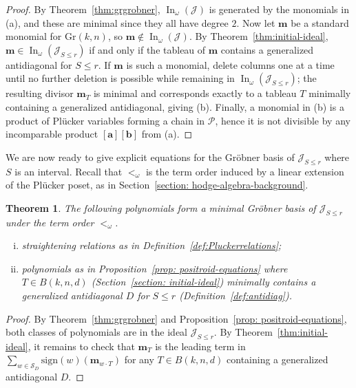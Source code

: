 \documentclass[12pt,reqno]{amsart}
\newtheorem{theorem}[lemma]{Theorem}
\theoremstyle{definition}
\newcommand{\inn}{\operatorname{In}}
\newcommand{\sgn}{\text{sign}}
\renewcommand{\aa}{\mathbf a}
\newcommand{\bb}{\mathbf b}
\newcommand{\mm}{\mathbf m}
\newcommand{\cJ}{\mathcal{J}}
\newcommand{\symm}{\mathcal{S}}
\newcommand{\gr}{\mathrm{Gr}}
\begin{document}
{\begin{proof}
By Theorem~\ref{thm:grgrobner}, \(\inn_\omega(\cJ)\) is generated by the monomials in (a),
and these are minimal since they all have degree \(2\).
Now let \(\mm\) be a standard monomial for \(\gr(k,n)\), so \(\mm\notin \inn_\omega(\cJ)\).
By Theorem~\ref{thm:initial-ideal}, \(\mm\in \inn_\omega(\cJ_{S\le r})\) if and only if the tableau of \(\mm\)
contains a generalized antidiagonal for \(S\le r\).
If \(\mm\) is such a monomial, delete columns one at a time until no further deletion is possible while remaining in
\(\inn_\omega(\cJ_{S\le r})\); the resulting divisor \(\mm_T\) is minimal and corresponds exactly to a tableau \(T\)
minimally containing a generalized antidiagonal, giving (b).
Finally, a monomial in (b) is a product of Pl\"ucker variables forming a chain in \(\mathcal P\), hence it is not divisible by any
incomparable product \([\aa][\bb]\) from (a).
\end{proof}


We are now ready to give explicit equations for the Gr\"{o}bner basis of $\cJ_{S\leq r}$ where $S$ is an interval. Recall that \(<_\omega\) is the term order induced by a linear extension of the Pl\"ucker poset, as in Section~\ref{section: hodge-algebra-background}. 

\begin{theorem}\label{thm: gb-basic-positroid} 
The following polynomials form a minimal Gr\"{o}bner basis of $\cJ_{S\leq r}$ under the term order $<_\omega$.

\begin{enumerate}[(i)]
    \item straightening relations as in Definition~\ref{def:Pluckerrelations};
\item polynomials as in Proposition~\ref{prop: positroid-equations} where
\(T\in B(k,n,d)\) (Section~\ref{section: initial-ideal}) minimally contains a generalized antidiagonal
\(D\) for \(S\le r\) (Definition~\ref{def:antidiag}).
\end{enumerate}
\end{theorem}

\begin{proof}
By Theorem~\ref{thm:grgrobner} and Proposition~\ref{prop: positroid-equations}, both classes of polynomials are in the ideal $\cJ_{S\leq r}$.
By Theorem~\ref{thm:initial-ideal}, it remains to check that $\mm_T$ is the leading term in $\sum_{w\in \symm_D} \sgn(w)(\mm_{w\cdot T})$ for any $T\in B(k,n,d)$ containing a generalized antidiagonal $D$. 


\end{proof}}
\end{document}
